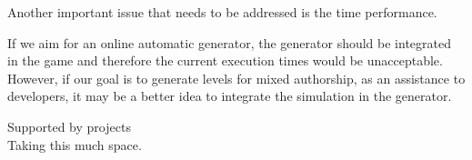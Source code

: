 \documentclass[sigconf]{acmart}
\begin{document}




Another important issue that needs to be addressed is the time performance. 

If we aim for an online automatic generator, the generator should be 
integrated in the game and therefore the current execution times would
be unacceptable. However, if our goal is to 
generate levels for mixed authorship, as an assistance to developers, it may be 
a better idea to integrate the simulation in the generator.



\begin{acks}
  Supported by projects\\
  Taking this much space.
\end{acks}

%

 
\end{document}
